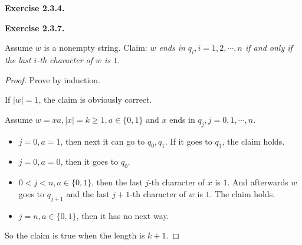 \documentclass[a4paper]{article}
\newtheorem*{proof}{Proof}
\newenvironment{exercise}[1]{
	\par
	\noindent\textbf{Exercise #1.}\quad
}{
	\par
	\bigskip
}
\begin{document}
\begin{exercise}{2.3.4}
\begin{center}
\end{center}
\end{exercise}

\begin{exercise}{2.3.7}
    Assume $w$ is a nonempty string. Claim: \textit{$w$ ends in $q_i,i=1,2,\cdots,n$ if and only if the last $i$-th character of 
    $w$ is $1$}.
    \begin{proof}
        Prove by induction.\par
        If $|w|=1$, the claim is obviously correct.\par
        Assume $w=xa,|x|=k\geqslant 1,a\in\{0,1\}$ and $x$ ends in $q_j,j=0,1,\cdots,n$. 
        \begin{itemize}
            \item $j=0,a=1$, then next it can go to $q_0,q_1$. If it goes to $q_1$, the claim holds.
            \item $j=0,a=0$, then it goes to $q_0$.
            \item $0<j<n,a\in\{0,1\}$, then the last $j$-th character of $x$ is $1$. And afterwards $w$ goes to $q_{j+1}$ and the
                last $j+1$-th character of $w$ is $1$. The claim holds.
            \item $j=n,a\in\{0,1\}$, then it has no next way.
        \end{itemize}\par
        So the claim is true when the length is $k+1$.
    \end{proof}
\end{exercise}
\end{document}
